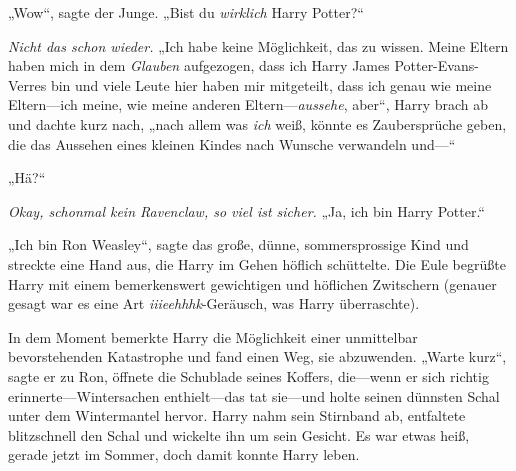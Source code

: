 „Wow“, sagte der Junge. „Bist du \emph{wirklich} Harry Potter?“

\emph{Nicht das schon wieder.} „Ich habe keine Möglichkeit, das zu wissen. Meine Eltern haben mich in dem \emph{Glauben} aufgezogen, dass ich Harry James Potter-Evans-Verres bin und viele Leute hier haben mir mitgeteilt, dass ich genau wie meine Eltern—ich meine, wie meine anderen Eltern—\emph{aussehe}, aber“, Harry brach ab und dachte kurz nach, „nach allem was \emph{ich} weiß, könnte es Zaubersprüche geben, die das Aussehen eines kleinen Kindes nach Wunsche verwandeln und—“

„Hä?“

\emph{Okay, schonmal kein Ravenclaw, so viel ist sicher.} „Ja, ich bin Harry Potter.“

„Ich bin Ron Weasley“, sagte das große, dünne, sommersprossige Kind und streckte eine Hand aus, die Harry im Gehen höflich schüttelte. Die Eule begrüßte Harry mit einem bemerkenswert gewichtigen und höflichen Zwitschern (genauer gesagt war es eine Art \emph{iiieehhhk}-Geräusch, was Harry überraschte).

In dem Moment bemerkte Harry die Möglichkeit einer unmittelbar bevorstehenden Katastrophe und fand einen Weg, sie abzuwenden. „Warte kurz“, sagte er zu Ron, öffnete die Schublade seines Koffers, die—wenn er sich richtig erinnerte—Wintersachen enthielt—das tat sie—und holte seinen dünnsten Schal unter dem Wintermantel hervor. Harry nahm sein Stirnband ab, entfaltete blitzschnell den Schal und wickelte ihn um sein Gesicht. Es war etwas heiß, gerade jetzt im Sommer, doch damit konnte Harry leben.

